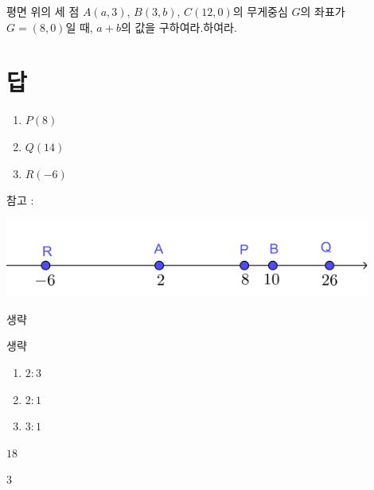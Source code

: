\documentclass{oblivoir}
\begin{document}
%
\prob{}\label{mid06}
평면 위의 세 점 \(A(a,3)\), \(B(3,b)\), \(C(12,0)\)의 무게중심 \(G\)의 좌표가 \(G=(8,0)\)일 때, \(a+b\)의 값을 구하여라.하여라.

\section*{답}

\begin{minipage}[t]{.49\textwidth}
%
\begin{enumerate}
\item
\(P(8)\)
\item
\(Q(14)\)
\item
\(R(-6)\)
\end{enumerate}
참고 :\\
\begin{center}
\includegraphics[width=0.9\textwidth]{int_03}
\end{center}


%
생략

%
생략

%
\begin{enumerate}
\item
\(2:3\)
\item
\(2:1\)
\item
\(3:1\)
\end{enumerate}

%
\(18\)

%
\(3\)

\end{minipage}
\end{document}

